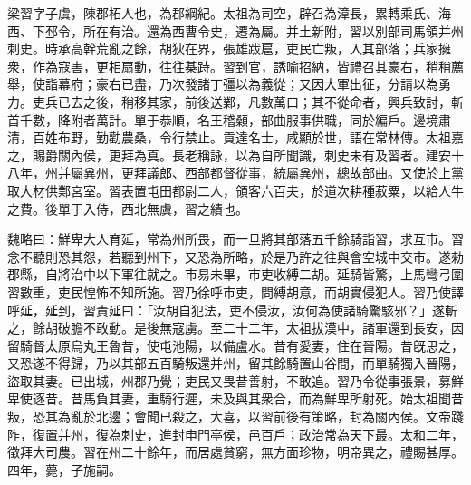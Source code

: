 
\begin{pinyinscope}
梁習字子虞，陳郡柘人也，為郡綱紀。太祖為司空，辟召為漳長，累轉乘氏、海西、下邳令，所在有治。還為西曹令史，遷為屬。并土新附，習以別部司馬領并州刺史。時承高幹荒亂之餘，胡狄在界，張雄跋扈，吏民亡叛，入其部落；兵家擁衆，作為寇害，更相扇動，往往棊跱。習到官，誘喻招納，皆禮召其豪右，稍稍薦舉，使詣幕府；豪右已盡，乃次發諸丁彊以為義從；又因大軍出征，分請以為勇力。吏兵已去之後，稍移其家，前後送鄴，凡數萬口；其不從命者，興兵致討，斬首千數，降附者萬計。單于恭順，名王稽顙，部曲服事供職，同於編戶。邊境肅清，百姓布野，勤勸農桑，令行禁止。貢達名士，咸顯於世，語在常林傳。太祖嘉之，賜爵關內侯，更拜為真。長老稱詠，以為自所聞識，刺史未有及習者。建安十八年，州并屬兾州，更拜議郎、西部都督從事，統屬兾州，總故部曲。又使於上黨取大材供鄴宮室。習表置屯田都尉二人，領客六百夫，於道次耕種菽粟，以給人牛之費。後單于入侍，西北無虞，習之績也。

魏略曰：鮮卑大人育延，常為州所畏，而一旦將其部落五千餘騎詣習，求互市。習念不聽則恐其怨，若聽到州下，又恐為所略，於是乃許之往與會空城中交市。遂勑郡縣，自將治中以下軍往就之。市易未畢，市吏收縛二胡。延騎皆驚，上馬彎弓圍習數重，吏民惶怖不知所施。習乃徐呼市吏，問縛胡意，而胡實侵犯人。習乃使譯呼延，延到，習責延曰：「汝胡自犯法，吏不侵汝，汝何為使諸騎驚駭邪？」遂斬之，餘胡破膽不敢動。是後無寇虜。至二十二年，太祖拔漢中，諸軍還到長安，因留騎督太原烏丸王魯昔，使屯池陽，以備盧水。昔有愛妻，住在晉陽。昔旣思之，又恐遂不得歸，乃以其部五百騎叛還并州，留其餘騎置山谷間，而單騎獨入晉陽，盜取其妻。已出城，州郡乃覺；吏民又畏昔善射，不敢追。習乃令從事張景，募鮮卑使逐昔。昔馬負其妻，重騎行遲，未及與其衆合，而為鮮卑所射死。始太祖聞昔叛，恐其為亂於北邊；會聞已殺之，大喜，以習前後有策略，封為關內侯。文帝踐阼，復置并州，復為刺史，進封申門亭侯，邑百戶；政治常為天下最。太和二年，徵拜大司農。習在州二十餘年，而居處貧窮，無方面珍物，明帝異之，禮賜甚厚。四年，薨，子施嗣。


\end{pinyinscope}
